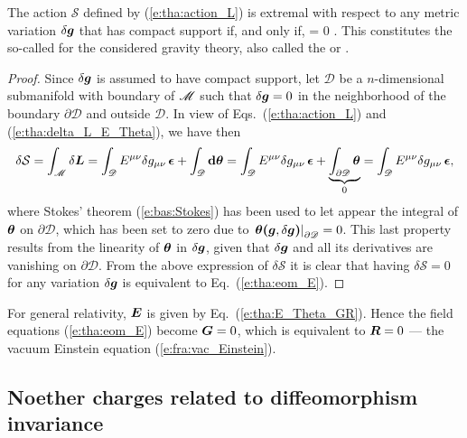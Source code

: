 \begin{prop}
The action $\mathcal{S}$ defined by (\ref{e:tha:action_L}) is extremal with respect to any
metric variation $\delta\bm{g}$ that has compact support if, and only if,
\be \label{e:tha:eom_E}
    \lld{}\rld = 0 .
\ee
This constitutes the so-called  for the considered gravity theory, also called the  or
.
\end{prop}
\begin{proof}
Since $\delta\bm{g}$ is assumed to have compact support, let $\mathscr{D}$ be
a $n$-dimensional submanifold with boundary of $\mathscr{M}$ such that
$\delta\bm{g} = 0$ in the neighborhood of the boundary $\partial\mathscr{D}$ and outside $\mathscr{D}$.
In view of Eqs.~(\ref{e:tha:action_L}) and (\ref{e:tha:delta_L_E_Theta}), we have then
\[
    \delta \mathcal{S} = \int_{\mathscr{M}} \delta\bm{L} = \int_{\mathscr{D}} E^{\mu\nu} \delta g_{\mu\nu} \, \bm{\epsilon}
        + \int_{\mathscr{D}} \mathbf{d} \bm{\theta}
     = \int_{\mathscr{D}} E^{\mu\nu} \delta g_{\mu\nu} \, \bm{\epsilon}
        + \underbrace{\int_{\partial\mathscr{D}} \bm{\theta}}_{0}
     =  \int_{\mathscr{D}} E^{\mu\nu} \delta g_{\mu\nu} \, \bm{\epsilon} ,
\]
where Stokes' theorem (\ref{e:bas:Stokes}) has been used to let appear the integral
of $\bm{\theta}$ on $\partial\mathscr{D}$, which has been set to zero due
to $\left. \bm{\theta}\textbf{(}\bm{g},\delta\bm{g}\textbf{)} \right|_{\partial\mathscr{D}} = 0$.
This last property results from the linearity of $\bm{\theta}$ in $\delta\bm{g}$, given that
$\delta\bm{g}$ and all its derivatives are vanishing on $\partial\mathscr{D}$.
From the above expression of $\delta\mathcal{S}$ it is clear that having $\delta \mathcal{S} = 0$ for any variation $\delta\bm{g}$ is equivalent to
Eq.~(\ref{e:tha:eom_E}).
\end{proof}

\begin{example}
\label{x:tha:field_equations_GR}
For general relativity, $\bm{E}$ is given by Eq.~(\ref{e:tha:E_Theta_GR}).
Hence the field equations (\ref{e:tha:eom_E}) become $\bm{G} = 0$, which
is equivalent to $\bm{R}=0$ --- the
vacuum Einstein equation
(\ref{e:fra:vac_Einstein}).
\end{example}

\subsection{Noether charges related to diffeomorphism invariance}

